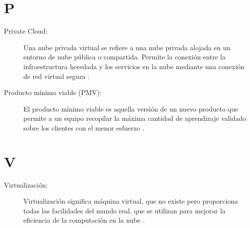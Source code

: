 \section*{P}
\begin{description}
  \item[Private Cloud:] Una nube privada virtual se refiere a una nube privada alojada en un entorno de nube pública o compartida. Permite la conexión entre la infraestructura heredada y los servicios en la nube mediante una conexión de red virtual segura \citep{Collins2016}.
  
  \item[Producto mínimo viable (PMV):] El producto mínimo viable es aquella versión de un nuevo producto que permite a un equipo recopilar la máxima cantidad de aprendizaje validado sobre los clientes con el menor esfuerzo \citep{Ries2020}.
\end{description}

\section*{V}
\begin{description}
  \item[Virtualización:] Virtualización significa máquina virtual, que no existe pero proporciona todas las facilidades del mundo real, que se utilizan para mejorar la eficiencia de la computación en la nube \citep{Meena2021}.
\end{description}